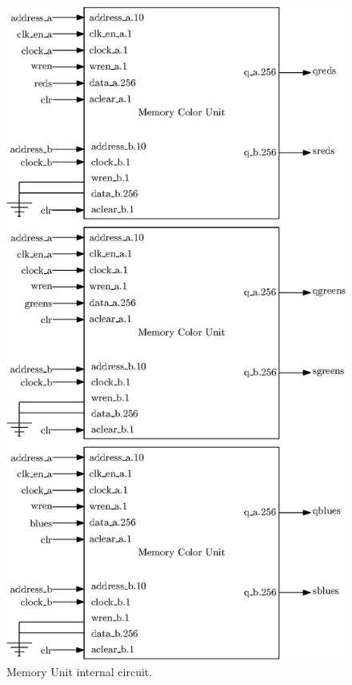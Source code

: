 \begin{figure}[H]
    \centering
    \includegraphics[scale=1.0]{Chapter4-GPU_CLKU/res/memory_unit_in}
    \caption{Memory Unit internal circuit.}
    \label{fig:gpu/memory_unit_in}
\end{figure}

